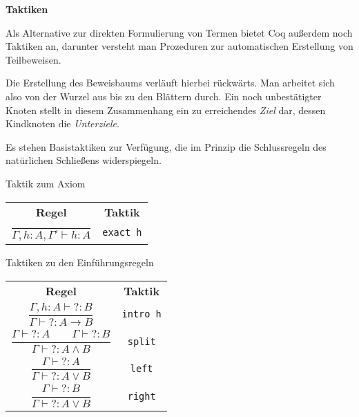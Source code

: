 \documentclass[8pt]{beamer}
\newcommand{\strong}[1]{\textsf{\textbf{#1}}}
\newcommand{\centerheadline}[1]{%
  \begin{center}\strong{#1}\end{center}}
\newcommand{\parspace}{\vspace{0.8em}}
\newcommand{\unres}{{?}}
\begin{document}
\begin{frame}
\centerheadline{Taktiken}
\end{frame}

\begin{frame}
Als Alternative zur direkten Formulierung von Termen bietet Coq
außerdem noch Taktiken an, darunter versteht man Prozeduren zur
automatischen Erstellung von Teilbeweisen.\pause

\parspace
Die Erstellung des Beweisbaums verläuft hierbei rückwärts.
Man arbeitet sich also von der Wurzel aus bis zu den Blättern durch.
Ein noch unbestätigter Knoten stellt in diesem Zusammenhang ein zu
erreichendes \emph{Ziel} dar, dessen Kindknoten die \emph{Unterziele}.

\parspace
Es stehen Basistaktiken zur Verfügung, die im Prinzip die Schlussregeln
des natürlichen Schließens widerspiegeln.
\end{frame}

\begin{frame}
\begin{block}{Taktik zum Axiom}
\begin{center}
\begin{tabular}{c@{\qquad\quad}c}
\strong{Regel} & \strong{Taktik}\\[6pt]
$\dfrac{}{\Gamma, h\colon A, \Gamma'\vdash h\colon A}$
& \texttt{exact h}
\end{tabular}
\end{center}
\end{block}
\end{frame}

\begin{frame}
\begin{block}{Taktiken zu den Einführungsregeln}
\begin{center}
\begin{tabular}{c@{\qquad\quad}c}
\strong{Regel} & \strong{Taktik}\\[6pt]
$\dfrac{\Gamma, h\colon A\vdash\unres\colon B}{\Gamma\vdash\unres\colon A\to B}$
& \texttt{intro h}\\[14pt]
$\dfrac{\Gamma\vdash\unres\colon A\qquad\Gamma\vdash\unres\colon B}
  {\Gamma\vdash\unres\colon A\land B}$
& \texttt{split}\\[14pt]
$\dfrac{\Gamma\vdash\unres\colon A}{\Gamma\vdash\unres\colon A\lor B}$
& \texttt{left}\\[14pt]
$\dfrac{\Gamma\vdash\unres\colon B}{\Gamma\vdash\unres\colon A\lor B}$
& \texttt{right}
\end{tabular}
\end{center}
\end{block}
\end{frame}
\end{document}
